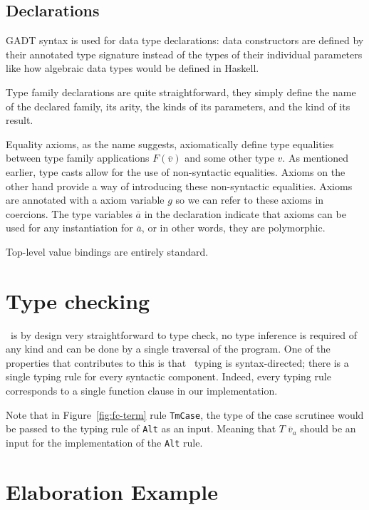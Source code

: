 \subsection{Declarations}

GADT syntax is used for data type declarations: data constructors are defined by
their annotated type signature instead of the types of their individual
parameters like how algebraic data types would be defined in Haskell.

Type family declarations are quite straightforward, they simply define the name
of the declared family, its arity, the kinds of its parameters, and the kind of
its result.

Equality axioms, as the name suggests, axiomatically define type equalities
between type family applications $F(\overline{v})$ and some other type $v$. As
mentioned earlier, type casts allow for the use of non-syntactic equalities.
Axioms on the other hand provide a way of introducing these non-syntactic
equalities. Axioms are annotated with a axiom variable $g$ so we can refer to
these axioms in coercions. The type variables $\overline{a}$ in the declaration
indicate that axioms can be used for any instantiation for $\overline{a}$, or in
other words, they are polymorphic.

Top-level value bindings are entirely standard.

\newpage

\section{Type checking}

\systemfc~is by design very straightforward to type check, no type inference
is required of any kind and can be done by a single traversal of the program.
One of the properties that contributes to this is that \systemfc~typing is
syntax-directed; there is a single typing rule for every syntactic component.
Indeed, every typing rule corresponds to a single function clause in our
implementation.

Note that in Figure~\ref{fig:fc-term} rule \texttt{TmCase}, the type of the case
scrutinee would be passed to the typing rule of \texttt{Alt} as an input.
Meaning that $T \; \overline{v}_a$ should be an input for the implementation of
the \texttt{Alt} rule.

\section{Elaboration Example}

